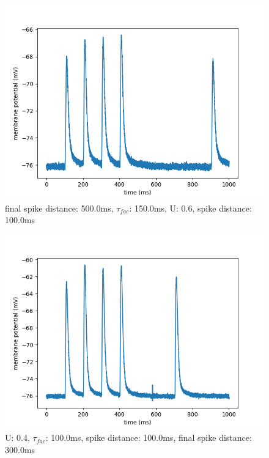 \documentclass[10pt,a4paper]{scrartcl}
\begin{document}
\newpage

\begin{figure} [ht]
\begin{center}
\label{fig:abb26}
\caption{final spike distance: 500.0ms, $\tau_{fac}$: 150.0ms, U: 0.6, spike distance: 100.0ms}
\includegraphics[scale=0.35]{pictures/final_spike_variation_16.pdf} 
\end{center}
\end{figure}

\begin{figure} [ht]
\begin{center}
\label{fig:abb27}
\caption{U: 0.4, $\tau_{fac}$: 100.0ms, spike distance: 100.0ms, final spike distance: 300.0ms}
\includegraphics[scale=0.35]{pictures/final_spike_variation_17.pdf} 
\end{center}
\end{figure}
\end{document}
